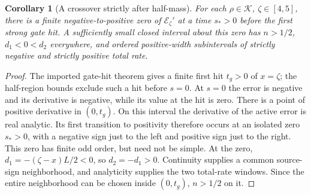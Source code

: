 \documentclass[11pt]{article}
\numberwithin{equation}{section}
\newtheorem{corollary}[theorem]{Corollary}
\theoremstyle{remark}\newtheorem{remark}[theorem]{Remark}
\newcommand{\1}{\mathbf 1}
\begin{document}
\begin{corollary}[A crossover strictly after half-mass]
\label{inc:AN06:v1:posthalf}
For each $\rho\in\mathcal K$, $\zeta\in[4,5]$, there is a finite
negative-to-positive zero of $\mathcal E_\zeta'$ at a time $s_*>0$ before
the first strong gate hit. A sufficiently small closed interval about this
zero has $n>1/2$, $d_1<0<d_2$ everywhere, and ordered positive-width
subintervals of strictly negative and strictly positive total rate.
\end{corollary}
\begin{proof}
The imported gate-hit theorem gives a finite first hit $t_g>0$ of $x=\zeta$;
the half-region bounds exclude such a hit before $s=0$.
At $s=0$ the error is negative and its derivative is negative, while its
value at the hit is zero. There is a point of positive derivative in
$(0,t_g)$. On this interval the derivative of the active error is real
analytic. Its first transition to positivity therefore occurs at an
isolated zero $s_*>0$, with a negative sign just to the left and positive
sign just to the right. This zero has finite odd order, but need not be
simple. At the zero, $d_1=-(\zeta-x)L/2<0$, so $d_2=-d_1>0$.
Continuity supplies a common source-sign neighborhood, and analyticity
supplies the two total-rate windows. Since the entire neighborhood can be
chosen inside $(0,t_g)$, $n>1/2$ on it.
\end{proof}
\end{document}
